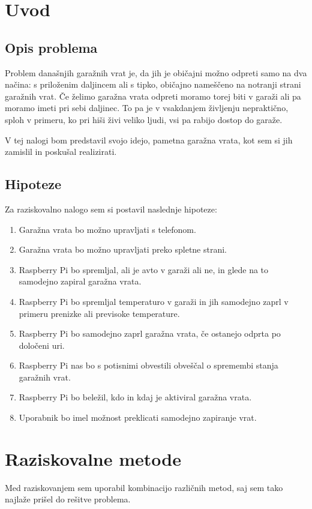\documentclass[11pt]{article}
\begin{document}

\newpage
{}
\setcounter{page}{6}
\section{Uvod}
\subsection{Opis problema}
Problem današnjih garažnih vrat je, da jih je običajni možno odpreti samo na dva načina: s priloženim daljincem ali s tipko, običajno nameščeno na notranji strani garažnih vrat. Če želimo garažna vrata odpreti moramo torej biti v garaži ali pa moramo imeti pri sebi daljinec. To pa je v vsakdanjem življenju nepraktično, sploh v primeru, ko pri hiši živi veliko ljudi, vsi pa rabijo dostop do garaže.

V tej nalogi bom predstavil svojo idejo, pametna garažna vrata, kot sem si jih zamislil in poskušal realizirati.

\subsection{Hipoteze}
Za raziskovalno nalogo sem si postavil naslednje hipoteze:
\begin{enumerate}
  \setlength\itemsep{0.5mm}
    \item Garažna vrata bo možno upravljati s telefonom.
    \item Garažna vrata bo možno upravljati preko spletne strani.
    \item Raspberry Pi bo spremljal, ali je avto v garaži ali ne, in glede na to samodejno zapiral garažna vrata.
    \item Raspberry Pi bo spremljal temperaturo v garaži in jih samodejno zaprl v primeru prenizke ali previsoke temperature.
    \item Raspberry Pi bo samodejno zaprl garažna vrata, če ostanejo odprta po določeni uri.
    \item Raspberry Pi nas bo s potisnimi obvestili obveščal o spremembi stanja garažnih vrat.
    \item Raspberry Pi bo beležil, kdo in kdaj je aktiviral garažna vrata.
    \item Uporabnik bo imel možnost preklicati samodejno zapiranje vrat.
\end{enumerate}

\section{Raziskovalne metode}
Med raziskovanjem sem uporabil kombinacijo različnih metod, saj sem tako najlaže prišel do rešitve problema.
\end{document}

